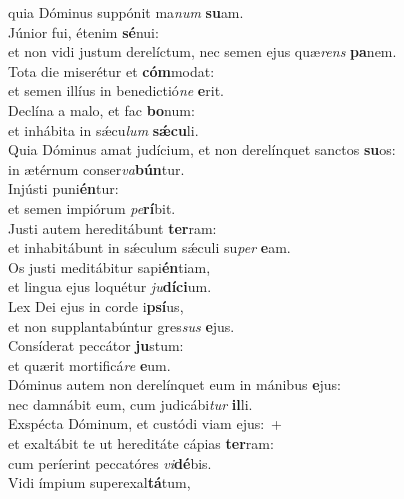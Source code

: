 \oddverse quia Dóminus suppónit ma\textit{num} \textbf{su}am.\\
\evenverse Júnior fui, étenim \textbf{sé}nui:~\*\\
\evenverse et non vidi justum derelíctum, nec semen ejus quæ\textit{rens} \textbf{pa}nem.\\
\oddverse Tota die miserétur et \textbf{cóm}modat:~\*\\
\oddverse et semen illíus in benedictió\textit{ne} \textbf{e}rit.\\
\evenverse Declína a malo, et fac \textbf{bo}num:~\*\\
\evenverse et inhábita in sǽcu\textit{lum} \textbf{sǽ}\textbf{cu}li.\\
\oddverse Quia Dóminus amat judícium, et non derelínquet sanctos \textbf{su}os:~\*\\
\oddverse in ætérnum conser\textit{va}\textbf{bún}tur.\\
\evenverse Injústi puni\textbf{én}tur:~\*\\
\evenverse et semen impiórum \textit{pe}\textbf{rí}bit.\\
\oddverse Justi autem hereditábunt \textbf{ter}ram:~\*\\
\oddverse et inhabitábunt in sǽculum sǽculi su\textit{per} \textbf{e}am.\\
\evenverse Os justi meditábitur sapi\textbf{én}tiam,~\*\\
\evenverse et lingua ejus loquétur \textit{ju}\textbf{dí}\textbf{ci}um.\\
\oddverse Lex Dei ejus in corde i\textbf{psí}us,~\*\\
\oddverse et non supplantabúntur gres\textit{sus} \textbf{e}jus.\\
\evenverse Consíderat peccátor \textbf{ju}stum:~\*\\
\evenverse et quærit mortificá\textit{re} \textbf{e}um.\\
\oddverse Dóminus autem non derelínquet eum in mánibus \textbf{e}jus:~\*\\
\oddverse nec damnábit eum, cum judicábi\textit{tur} \textbf{il}li.\\
\evenverse Exspécta Dóminum, et custódi viam ejus:~+\\
\evenverse  et exaltábit te ut hereditáte cápias \textbf{ter}ram:~\*\\
\evenverse cum períerint peccatóres \textit{vi}\textbf{dé}bis.\\
\oddverse Vidi ímpium superexal\textbf{tá}tum,~\*\\
